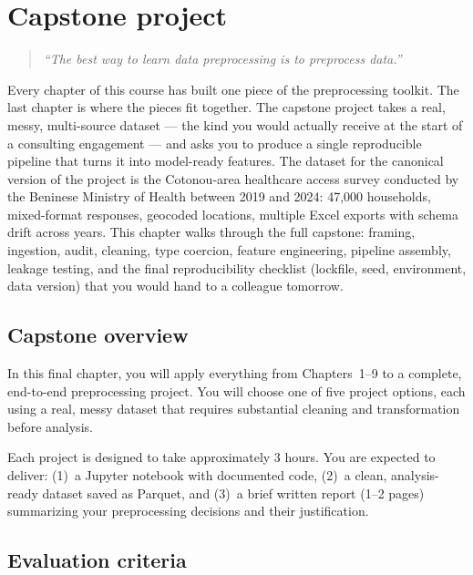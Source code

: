 \chapter{Capstone project}
\label{ch:capstone}

\begin{quote}
\emph{``The best way to learn data preprocessing is to preprocess data.''}
\end{quote}

Every chapter of this course has built one piece of the preprocessing toolkit. The last chapter is where the pieces fit together. The capstone project takes a real, messy, multi-source dataset --- the kind you would actually receive at the start of a consulting engagement --- and asks you to produce a single reproducible pipeline that turns it into model-ready features. The dataset for the canonical version of the project is the Cotonou-area healthcare access survey conducted by the Beninese Ministry of Health between 2019 and 2024: 47{,}000 households, mixed-format responses, geocoded locations, multiple Excel exports with schema drift across years. This chapter walks through the full capstone: framing, ingestion, audit, cleaning, type coercion, feature engineering, pipeline assembly, leakage testing, and the final reproducibility checklist (lockfile, seed, environment, data version) that you would hand to a colleague tomorrow.

\section{Capstone overview}

In this final chapter, you will apply everything from Chapters~1--9 to a complete, end-to-end preprocessing project. You will choose one of five project options, each using a real, messy dataset that requires substantial cleaning and transformation before analysis.

\begin{datatip}
Each project is designed to take approximately 3 hours. You are expected to deliver: (1)~a Jupyter notebook with documented code, (2)~a clean, analysis-ready dataset saved as Parquet, and (3)~a brief written report (1--2 pages) summarizing your preprocessing decisions and their justification.
\end{datatip}

\section{Evaluation criteria}

